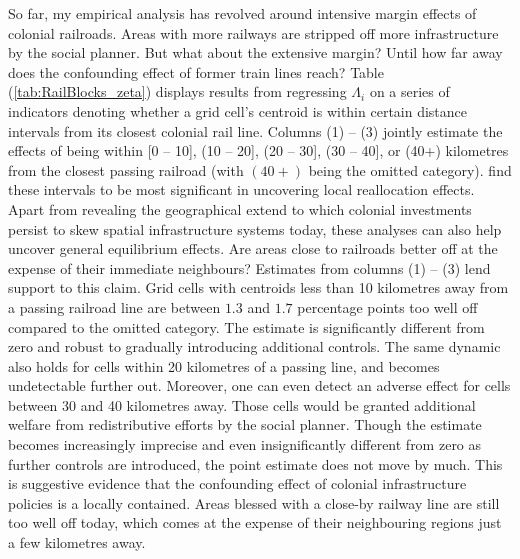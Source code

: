\documentclass[11pt, oneside]{article}   	%
\let\oldref\ref
\renewcommand{\ref}[1]{(\oldref{#1})}
\begin{document}

So far, my empirical analysis has revolved around intensive margin effects of colonial railroads. Areas with more railways are stripped off more infrastructure by the social planner. But what about the extensive margin? Until how far away does the confounding effect of former train lines reach? Table \ref{tab:RailBlocks_zeta} displays results from regressing $\Lambda_{i}$ on a series of indicators denoting whether a grid cell's centroid is within certain distance intervals from its closest colonial rail line. Columns (1) -- (3) jointly estimate the effects of being within [0 -- 10], (10 -- 20], (20 -- 30], (30 -- 40], or (40+) kilometres from the closest passing railroad (with $(40+)$ being the omitted category). \cite{Jedwab_PermanentEffectsTransportation_2016a} find these intervals to be most significant in uncovering local reallocation effects. Apart from revealing the geographical extend to which colonial investments persist to skew spatial infrastructure systems today, these analyses can also help uncover general equilibrium effects. Are areas close to railroads better off at the expense of their immediate neighbours? Estimates from columns (1) -- (3) lend support to this claim. Grid cells with centroids less than 10 kilometres away from a passing railroad line are between $1.3$ and $1.7$ percentage points too well off compared to the omitted category. The estimate is significantly different from zero and robust to gradually introducing additional controls. The same dynamic also holds for cells within 20 kilometres of a passing line, and becomes undetectable further out. Moreover, one can even detect an adverse effect for cells between 30 and 40 kilometres away. Those cells would be granted additional welfare from redistributive efforts by the social planner. Though the estimate becomes increasingly imprecise and even insignificantly different from zero as further controls are introduced, the point estimate does not move by much. This is suggestive evidence that the confounding effect of colonial infrastructure policies is a locally contained. Areas blessed with a close-by railway line are still too well off today, which comes at the expense of their neighbouring regions just a few kilometres away.
\end{document}
